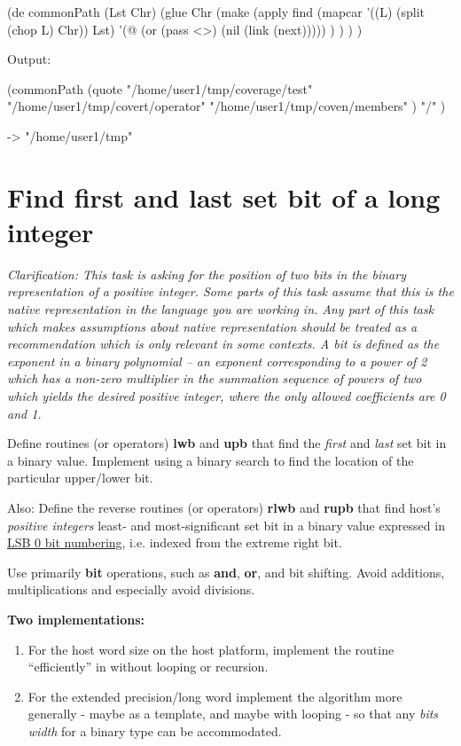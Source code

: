 \begin{wideverbatim}

(de commonPath (Lst Chr)
   (glue Chr
      (make
         (apply find
            (mapcar '((L) (split (chop L) Chr)) Lst)
            '(@ (or (pass <>) (nil (link (next))))) ) ) ) )

Output:

(commonPath
   (quote
      "/home/user1/tmp/coverage/test"
      "/home/user1/tmp/covert/operator"
      "/home/user1/tmp/coven/members" )
   "/" )

-> "/home/user1/tmp"

\end{wideverbatim}

\pagebreak{}
\section*{Find first and last set bit of a long integer}

\emph{Clarification: This task is asking for the position of two bits in
the binary representation of a positive integer. Some parts of this task
assume that this is the native representation in the language you are
working in. Any part of this task which makes assumptions about native
representation should be treated as a recommendation which is only
relevant in some contexts. A bit is defined as the exponent in a binary
polynomial -- an exponent corresponding to a power of 2 which has a
non-zero multiplier in the summation sequence of powers of two which
yields the desired positive integer, where the only allowed coefficients
are 0 and 1.}

Define routines (or operators) \textbf{lwb} and \textbf{upb} that find
the \emph{first} and \emph{last} set bit in a binary value. Implement
using a binary search to find the location of the particular upper/lower
bit.

Also: Define the reverse routines (or operators) \textbf{rlwb} and
\textbf{rupb} that find host's \emph{positive integers} least- and
most-significant set bit in a binary value expressed in
\href{http://en.wikipedia.org/wiki/Bit\_numbering\#LSB\_0\_bit\_numbering}{LSB
0 bit numbering}, i.e. indexed from the extreme right bit.

Use primarily \textbf{bit} operations, such as \textbf{and},
\textbf{or}, and bit shifting. Avoid additions, multiplications and
especially avoid divisions.

\textbf{Two implementations:}

\begin{enumerate}
\item
  For the host word size on the host platform, implement the routine
  ``efficiently'' in without looping or recursion.
\item
  For the extended precision/long word implement the algorithm more
  generally - maybe as a template, and maybe with looping - so that any
  \emph{bits width} for a binary type can be accommodated.
\end{enumerate}

